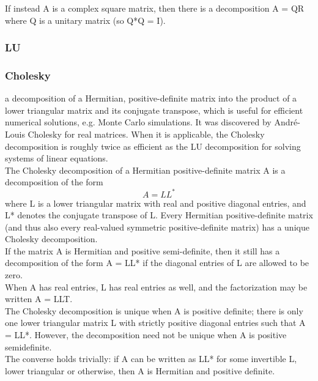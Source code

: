If instead A is a complex square matrix, then there is a decomposition A = QR where Q is a unitary matrix (so Q*Q = I).

\subsubsection{LU} 

\subsubsection{Cholesky} 
a decomposition of a Hermitian, positive-definite matrix into the product of a lower triangular matrix and its conjugate transpose, which is useful for efficient numerical solutions, e.g. Monte Carlo simulations. It was discovered by André-Louis Cholesky for real matrices. When it is applicable, the Cholesky decomposition is roughly twice as efficient as the LU decomposition for solving systems of linear equations.  \\

The Cholesky decomposition of a Hermitian positive-definite matrix A is a decomposition of the form
\begin{equation}
A = LL^{*}
\end{equation}
where L is a lower triangular matrix with real and positive diagonal entries, and L* denotes the conjugate transpose of L. Every Hermitian positive-definite matrix (and thus also every real-valued symmetric positive-definite matrix) has a unique Cholesky decomposition. \\

If the matrix A is Hermitian and positive semi-definite, then it still has a decomposition of the form A = LL* if the diagonal entries of L are allowed to be zero. \\

When A has real entries, L has real entries as well, and the factorization may be written A = LLT. \\

The Cholesky decomposition is unique when A is positive definite; there is only one lower triangular matrix L with strictly positive diagonal entries such that A = LL*. However, the decomposition need not be unique when A is positive semidefinite. \\

The converse holds trivially: if A can be written as LL* for some invertible L, lower triangular or otherwise, then A is Hermitian and positive definite.

